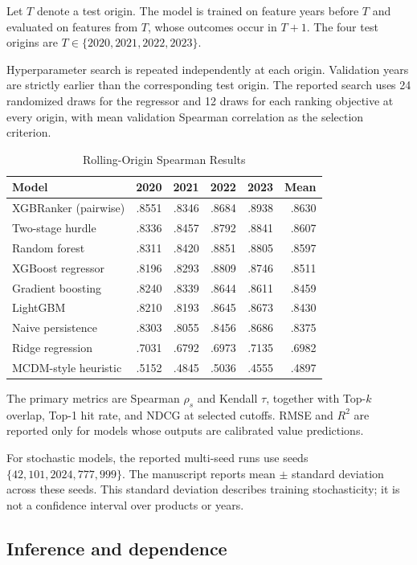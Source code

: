 \documentclass[conference]{IEEEtran}
\begin{document}
Let $T$ denote a test origin. The model is trained on feature years before $T$ and evaluated on features from $T$, whose outcomes occur in $T+1$. The four test origins are $T\in\{2020,2021,2022,2023\}$.

Hyperparameter search is repeated independently at each origin. Validation years are strictly earlier than the corresponding test origin. The reported search uses 24 randomized draws for the regressor and 12 draws for each ranking objective at every origin, with mean validation Spearman correlation as the selection criterion.

\begin{table}[t]
\caption{Rolling-Origin Spearman Results}
\centering
\scriptsize
\begin{tabular}{lrrrrr}
\toprule
Model & 2020 & 2021 & 2022 & 2023 & Mean\\
\midrule
XGBRanker (pairwise) & .8551 & .8346 & .8684 & .8938 & .8630\\
Two-stage hurdle & .8336 & .8457 & .8792 & .8841 & .8607\\
Random forest & .8311 & .8420 & .8851 & .8805 & .8597\\
XGBoost regressor & .8196 & .8293 & .8809 & .8746 & .8511\\
Gradient boosting & .8240 & .8339 & .8644 & .8611 & .8459\\
LightGBM & .8210 & .8193 & .8645 & .8673 & .8430\\
Naive persistence & .8303 & .8055 & .8456 & .8686 & .8375\\
Ridge regression & .7031 & .6792 & .6973 & .7135 & .6982\\
MCDM-style heuristic & .5152 & .4845 & .5036 & .4555 & .4897\\
\bottomrule
\end{tabular}
\end{table}

The primary metrics are Spearman $\rho_s$ and Kendall $\tau$, together with Top-$k$ overlap, Top-1 hit rate, and NDCG at selected cutoffs. RMSE and $R^2$ are reported only for models whose outputs are calibrated value predictions.

For stochastic models, the reported multi-seed runs use seeds $\{42,101,2024,777,999\}$. The manuscript reports mean $\pm$ standard deviation across these seeds. This standard deviation describes training stochasticity; it is not a confidence interval over products or years.

\subsection{Inference and dependence}
\end{document}
